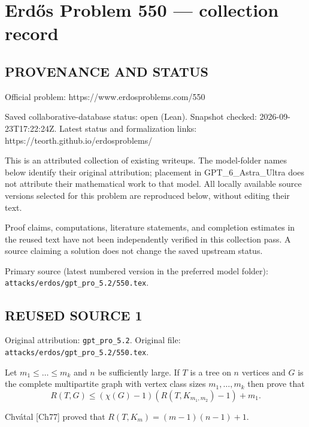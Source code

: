 \section*{Erd\H{o}s Problem 550 --- collection record}

\subsection*{PROVENANCE AND STATUS}
Official problem: https://www.erdosproblems.com/550

Saved collaborative-database status: open (Lean).
Snapshot checked: 2026-09-23T17:22:24Z.
Latest status and formalization links: https://teorth.github.io/erdosproblems/

This is an attributed collection of existing writeups. The model-folder names below identify their original attribution; placement in GPT\_6\_Astra\_Ultra does not attribute their mathematical work to that model. All locally available source versions selected for this problem are reproduced below, without editing their text.

Proof claims, computations, literature statements, and completion estimates in the reused text have not been independently verified in this collection pass. A source claiming a solution does not change the saved upstream status.

Primary source (latest numbered version in the preferred model folder): \texttt{attacks/erdos/gpt\_pro\_5.2/550.tex}.

\subsection*{REUSED SOURCE 1}
Original attribution: \texttt{gpt\_pro\_5.2}.
Original file: \texttt{attacks/erdos/gpt\_pro\_5.2/550.tex}.


Let $m_1\leq \ldots \leq m_k$ and $n$ be sufficiently large. If $T$ is a tree on $n$ vertices and $G$ is the complete multipartite graph with vertex class sizes $m_1,\ldots,m_k$ then prove that 
\[
R(T,G) \leq (\chi(G)-1)(R(T,K_{m_1,m_2})-1)+m_1.
\]

Chv\'atal [Ch77] proved that $R(T,K_m)=(m-1)(n-1)+1$.


